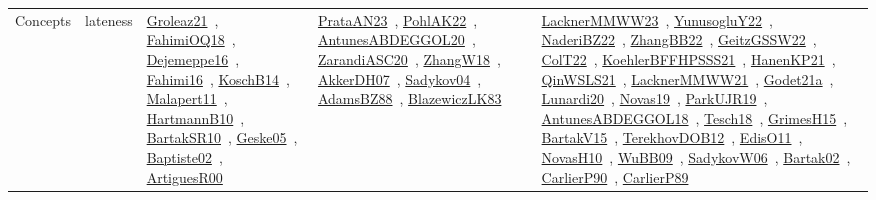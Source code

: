 {\begin{longtable}{lp{3cm}>{\raggedright\arraybackslash}p{6cm}>{\raggedright\arraybackslash}p{6cm}>{\raggedright\arraybackslash}p{8cm}}
Concepts & lateness & \href{works/Groleaz21.pdf}{Groleaz21}~\cite{Groleaz21}, \href{works/FahimiOQ18.pdf}{FahimiOQ18}~\cite{FahimiOQ18}, \href{works/Dejemeppe16.pdf}{Dejemeppe16}~\cite{Dejemeppe16}, \href{works/Fahimi16.pdf}{Fahimi16}~\cite{Fahimi16}, \href{works/KoschB14.pdf}{KoschB14}~\cite{KoschB14}, \href{works/Malapert11.pdf}{Malapert11}~\cite{Malapert11}, \href{works/HartmannB10.pdf}{HartmannB10}~\cite{HartmannB10}, \href{works/BartakSR10.pdf}{BartakSR10}~\cite{BartakSR10}, \href{works/Geske05.pdf}{Geske05}~\cite{Geske05}, \href{works/Baptiste02.pdf}{Baptiste02}~\cite{Baptiste02}, \href{works/ArtiguesR00.pdf}{ArtiguesR00}~\cite{ArtiguesR00} & \href{works/PrataAN23.pdf}{PrataAN23}~\cite{PrataAN23}, \href{works/PohlAK22.pdf}{PohlAK22}~\cite{PohlAK22}, \href{works/AntunesABDEGGOL20.pdf}{AntunesABDEGGOL20}~\cite{AntunesABDEGGOL20}, \href{works/ZarandiASC20.pdf}{ZarandiASC20}~\cite{ZarandiASC20}, \href{works/ZhangW18.pdf}{ZhangW18}~\cite{ZhangW18}, \href{works/AkkerDH07.pdf}{AkkerDH07}~\cite{AkkerDH07}, \href{works/Sadykov04.pdf}{Sadykov04}~\cite{Sadykov04}, \href{works/AdamsBZ88.pdf}{AdamsBZ88}~\cite{AdamsBZ88}, \href{works/BlazewiczLK83.pdf}{BlazewiczLK83}~\cite{BlazewiczLK83} & \href{works/LacknerMMWW23.pdf}{LacknerMMWW23}~\cite{LacknerMMWW23}, \href{works/YunusogluY22.pdf}{YunusogluY22}~\cite{YunusogluY22}, \href{works/NaderiBZ22.pdf}{NaderiBZ22}~\cite{NaderiBZ22}, \href{works/ZhangBB22.pdf}{ZhangBB22}~\cite{ZhangBB22}, \href{works/GeitzGSSW22.pdf}{GeitzGSSW22}~\cite{GeitzGSSW22}, \href{works/ColT22.pdf}{ColT22}~\cite{ColT22}, \href{works/KoehlerBFFHPSSS21.pdf}{KoehlerBFFHPSSS21}~\cite{KoehlerBFFHPSSS21}, \href{works/HanenKP21.pdf}{HanenKP21}~\cite{HanenKP21}, \href{works/QinWSLS21.pdf}{QinWSLS21}~\cite{QinWSLS21}, \href{works/LacknerMMWW21.pdf}{LacknerMMWW21}~\cite{LacknerMMWW21}, \href{works/Godet21a.pdf}{Godet21a}~\cite{Godet21a}, \href{works/Lunardi20.pdf}{Lunardi20}~\cite{Lunardi20}, \href{works/Novas19.pdf}{Novas19}~\cite{Novas19}, \href{works/ParkUJR19.pdf}{ParkUJR19}~\cite{ParkUJR19}, \href{works/AntunesABDEGGOL18.pdf}{AntunesABDEGGOL18}~\cite{AntunesABDEGGOL18}, \href{works/Tesch18.pdf}{Tesch18}~\cite{Tesch18}, \href{works/GrimesH15.pdf}{GrimesH15}~\cite{GrimesH15}, \href{works/BartakV15.pdf}{BartakV15}~\cite{BartakV15}, \href{works/TerekhovDOB12.pdf}{TerekhovDOB12}~\cite{TerekhovDOB12}, \href{works/EdisO11.pdf}{EdisO11}~\cite{EdisO11}, \href{works/NovasH10.pdf}{NovasH10}~\cite{NovasH10}, \href{works/WuBB09.pdf}{WuBB09}~\cite{WuBB09}, \href{works/SadykovW06.pdf}{SadykovW06}~\cite{SadykovW06}, \href{works/Bartak02.pdf}{Bartak02}~\cite{Bartak02}, \href{works/CarlierP90.pdf}{CarlierP90}~\cite{CarlierP90}, \href{works/CarlierP89.pdf}{CarlierP89}~\cite{CarlierP89}\\

\end{longtable}}
